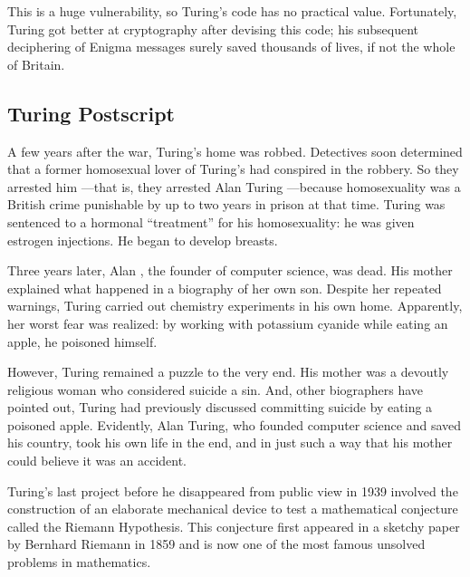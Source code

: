 This is a huge vulnerability, so Turing's code has no practical value.  Fortunately, Turing
got better at cryptography after devising this code; his subsequent deciphering of Enigma
messages surely saved thousands of lives, if not the whole of Britain.


\subsection{Turing Postscript}

A few years after the war, Turing's home was robbed.  Detectives soon determined that a
former homosexual lover of Turing's had conspired in the robbery.  So they arrested him
---that is, they arrested Alan Turing ---because homosexuality was a British crime
punishable by up to two years in prison at that time.  Turing was sentenced to a hormonal
``treatment'' for his homosexuality: he was given estrogen injections.  He began to develop
breasts.

Three years later, Alan , the founder of computer science, was dead.  His
mother explained what happened in a biography of her own son.  Despite her repeated
warnings, Turing carried out chemistry experiments in his own home.  Apparently, her worst
fear was realized: by working with potassium cyanide while eating an apple, he poisoned
himself.

However, Turing remained a puzzle to the very end.  His mother was a devoutly religious
woman who considered suicide a sin.  And, other biographers have pointed out, Turing had
previously discussed committing suicide by eating a poisoned apple.  Evidently, Alan
Turing, who founded computer science and saved his country, took his own life in the end,
and in just such a way that his mother could believe it was an accident.

Turing's last project before he disappeared from public view in 1939 involved the
construction of an elaborate mechanical device to test a mathematical conjecture called the
Riemann Hypothesis.  This conjecture first appeared in a sketchy paper by Bernhard Riemann
in 1859 and is now one of the most famous unsolved problems in mathematics.

